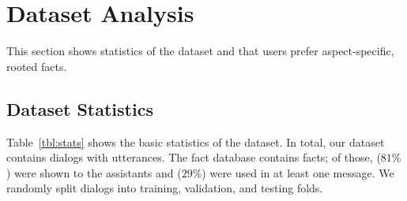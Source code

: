 \section{Dataset Analysis}
\label{sec:analysis}

This section shows statistics of the \rover{} dataset and that users prefer aspect-specific, rooted facts.

\subsection{Dataset Statistics}
\label{sec:stats}
Table~\ref{tbl:stats} shows the basic statistics of the \rover{} dataset.
In total, our dataset contains \ndialogsfull{} dialogs with \nutterfull{} utterances.
The fact database contains \nfactsfull{} facts; of those, \nshownfull{} ($81\%$) were shown to the assistants and \nusedfull{} ($29\%$) were used in at least one message.
We randomly split dialogs into training, validation, and testing folds.

\begin{table}[t]
    \centering
    \caption{
        \rover{} has \ndialogsfull{} dialogs. On average, dialogs have $12.9$ utterances.
        $60\%$ of the assistants' 90,534 utterances were liked.
    }
    \label{tbl:stats}
\end{table}


